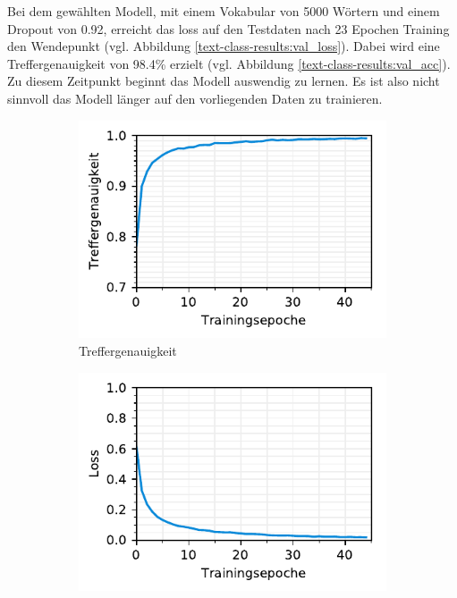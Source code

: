 Bei dem gewählten Modell, mit einem Vokabular von 5000 Wörtern und einem Dropout von 0.92, erreicht das loss auf den Testdaten nach 23 Epochen Training den Wendepunkt (vgl. Abbildung \ref{text-class-results:val_loss}). Dabei wird eine Treffergenauigkeit von 98.4\% erzielt (vgl. Abbildung \ref{text-class-results:val_acc}). Zu diesem Zeitpunkt beginnt das Modell auswendig zu lernen. Es ist also nicht sinnvoll das Modell länger auf den vorliegenden Daten zu trainieren.

\begin{figure}[h!] 
  \captionsetup{width=.9\linewidth}
  \caption[Statistiken aus dem Training der Text-basierten Klassifizierung von Rechnungen]{Statistiken aus dem Training der Text-basierten Klassifizierung von Rechnungen.}
  \label{text-class-results}
  \begin{subfigure}[b]{0.5\linewidth}
    \centering
    \includegraphics[scale=1]{graphics/matplot/textual-class__acc.pdf} 
    \caption{Treffergenauigkeit} 
    \label{text-class-results:val} 
    \vspace{2ex}
  \end{subfigure}%
  \begin{subfigure}[b]{0.5\linewidth}
    \centering
    \includegraphics[scale=1]{graphics/matplot/textual-class__loss.pdf} 

\end{subfigure}
\end{figure}
